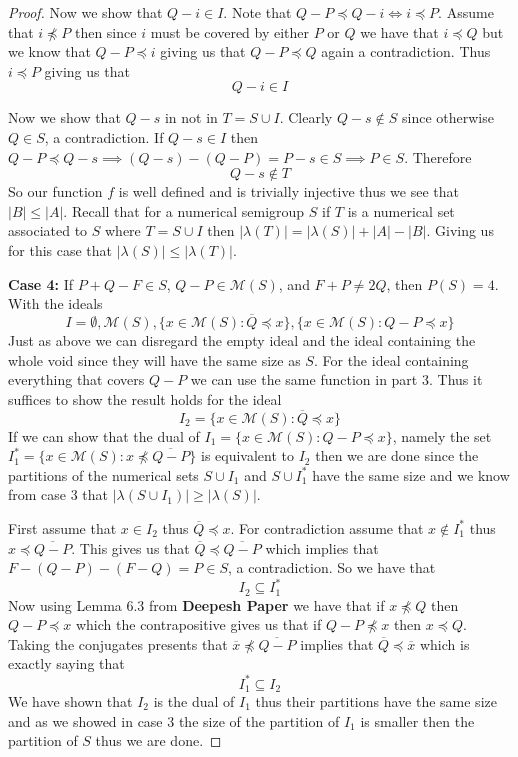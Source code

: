 \documentclass[11pt,letterpaper]{article}
\theoremstyle{definition}
\begin{document}
\begin{proof}
    Now we show that $Q-i\in I$. Note that $Q-P\preccurlyeq Q-i \iff i\preccurlyeq P$. Assume that $i\not\preccurlyeq P$ then since $i$ must be covered by either $P$ or $Q$ we have that $i\preccurlyeq Q$ but we know that $Q-P\preccurlyeq i$ giving us that $Q-P\preccurlyeq Q$ again a contradiction. Thus $i\preccurlyeq P$ giving us that \[Q-i\in I\]
    
    Now we show that $Q-s$ in not in $T=S\cup I$. Clearly $Q-s\notin S$ since otherwise $Q\in S$, a contradiction. If $Q-s\in I$ then $Q-P\preccurlyeq Q-s\implies (Q-s)-(Q-P)=P-s\in S\implies P\in S$. Therefore \[Q-s\notin T\]
    So our function $f$ is well defined and is trivially injective thus we see that $|B|\leq |A|$. Recall that for a numerical semigroup $S$ if $T$ is a numerical set associated to $S$ where $T=S\cup I$ then $|\lambda(T)|=|\lambda(S)|+|A|-|B|$. Giving us for this case that $|\lambda(S)|\leq |\lambda(T)|$.

    \textbf{Case 4:} If $P+Q-F\in S$, $Q-P\in\mathcal{M}(S)$, and $F+P\neq 2Q$, then $P(S)=4$. With the ideals 
    \[I=\emptyset,\mathcal{M}(S),\{x\in\mathcal{M}(S):\overline{Q}\preccurlyeq x\},\{x\in\mathcal{M}(S):Q-P\preccurlyeq x\}\]
    Just as above we can disregard the empty ideal and the ideal containing the whole void since they will have the same size as $S$. For the ideal containing everything that covers $Q-P$ we can use the same function in part 3. Thus it suffices to show the result holds for the ideal 
    \[I_2=\{x\in\mathcal{M}(S):\overline{Q}\preccurlyeq x\}\]
    If we can show that the dual of $I_1=\{x\in\mathcal{M}(S):Q-P\preccurlyeq x\}$, namely the set
    $I^*_1=\{x\in\mathcal{M}(S):x\not\preccurlyeq\overline{Q-P}\}$ is equivalent to $I_2$ then we are done since the partitions of the numerical sets $S\cup I_1$ and $S\cup I_1^*$ have the same size and we know from case 3 that $|\lambda(S\cup I_1)|\geq |\lambda(S)|$. 

    First assume that $x\in I_2$ thus $\overline{Q}\preccurlyeq x$. For contradiction assume that $x\notin I_1^*$ thus $x\preccurlyeq\overline{Q-P}$. This gives us that $\overline{Q}\preccurlyeq\overline{Q-P}$ which implies that $F-(Q-P)-(F-Q)=P\in S$, a contradiction. So we have that 
    \[I_2\subseteq I_1^*\]
    Now using Lemma 6.3 from \textbf{Deepesh Paper} we have that if $x\not\preccurlyeq Q$ then $Q-P\preccurlyeq x$ which the contrapositive gives us that if $Q-P\not\preccurlyeq x$ then $x\preccurlyeq Q$. Taking the conjugates presents that $\overline{x}\not\preccurlyeq\overline{Q-P}$ implies that $\overline{Q}\preccurlyeq\overline{x}$ which is exactly saying that 
    \[I_1^*\subseteq I_2\]
    We have shown that $I_2$ is the dual of $I_1$ thus their partitions have the same size and as we showed in case 3 the size of the partition of $I_1$ is smaller then the partition of $S$ thus we are done.
\end{proof}
\end{document}
